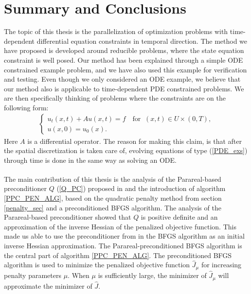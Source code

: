 \chapter{Summary and Conclusions} \label{summary chap}
The topic of this thesis is the parallelization of optimization problems with time-dependent differential equation constraints in temporal direction. The method we have proposed is developed around reducible problems, where the state equation constraint is well posed. Our method has been explained through a simple ODE constrained example problem, and we have also used this example for verification and testing. Even though we only considered an ODE example, we believe that our method also is applicable to time-dependent PDE constrained problems. We are then specifically thinking of problems where the constraints are on the following form:
\begin{align}
\left\{
     \begin{array}{lr}
       	u_t(x,t) + Au(x,t)=f \quad \textrm{for } \ (x,t)\in U\times(0,T),\\
       	u(x,0)=u_0(x).
     \end{array}
   \right. \label{PDE_exs}
\end{align}
Here $A$ is a differential operator. The reason for making this claim, is that after the spatial discretization is taken care of, evolving equations of type (\ref{PDE_exs}) through time is done in the same way as solving an ODE. 
\\
\\
The main contribution of this thesis is the analysis of the Parareal-based preconditioner $Q$ (\ref{Q_PC}) proposed in \cite{maday2002parareal} and the introduction of algorithm \ref{PPC_PEN_ALG}, based on the quadratic penalty method from section \ref{penalty_sec} and a preconditioned BFGS algorithm. The analysis of the Parareal-based preconditioner showed that $Q$ is positive definite and an approximation of the inverse Hessian of the penalized objective function. This made us able to use the preconditioner from \cite{maday2002parareal} in the BFGS algorithm as an initial inverse Hessian approximation. The Parareal-preconditioned BFGS algorithm is the central part of algorithm \ref{PPC_PEN_ALG}. The preconditioned BFGS algorithm is used to minimize the penalized objective function $\hat J_{\mu}$ for increasing penalty parameters $\mu$. When $\mu$ is sufficiently large, the minimizer of $\hat J_{\mu}$ will approximate the minimizer of $\hat J$.
\\
\\
